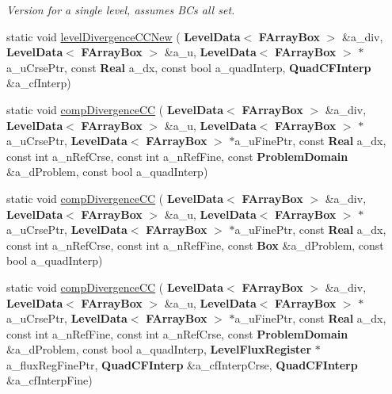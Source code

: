 \begin{DoxyCompactItemize}
\begin{DoxyCompactList}\small\item\em Version for a single level, assumes B\+Cs all set. \end{DoxyCompactList}\item 
static void \hyperlink{class_divergence_a77ec6a5b421cc2360223b7b0879786e8}{level\+Divergence\+C\+C\+New} (\textbf{ Level\+Data}$<$ \textbf{ F\+Array\+Box} $>$ \&a\+\_\+div, \textbf{ Level\+Data}$<$ \textbf{ F\+Array\+Box} $>$ \&a\+\_\+u, \textbf{ Level\+Data}$<$ \textbf{ F\+Array\+Box} $>$ $\ast$a\+\_\+u\+Crse\+Ptr, const \textbf{ Real} a\+\_\+dx, const bool a\+\_\+quad\+Interp, \textbf{ Quad\+C\+F\+Interp} \&a\+\_\+cf\+Interp)
\item 
static void \hyperlink{class_divergence_af3bff43b62b95d79fcd50484019e3e41}{comp\+Divergence\+CC} (\textbf{ Level\+Data}$<$ \textbf{ F\+Array\+Box} $>$ \&a\+\_\+div, \textbf{ Level\+Data}$<$ \textbf{ F\+Array\+Box} $>$ \&a\+\_\+u, \textbf{ Level\+Data}$<$ \textbf{ F\+Array\+Box} $>$ $\ast$a\+\_\+u\+Crse\+Ptr, \textbf{ Level\+Data}$<$ \textbf{ F\+Array\+Box} $>$ $\ast$a\+\_\+u\+Fine\+Ptr, const \textbf{ Real} a\+\_\+dx, const int a\+\_\+n\+Ref\+Crse, const int a\+\_\+n\+Ref\+Fine, const \textbf{ Problem\+Domain} \&a\+\_\+d\+Problem, const bool a\+\_\+quad\+Interp)
\item 
static void \hyperlink{class_divergence_ad1d85e2db60cacec07a004c9d0b19b24}{comp\+Divergence\+CC} (\textbf{ Level\+Data}$<$ \textbf{ F\+Array\+Box} $>$ \&a\+\_\+div, \textbf{ Level\+Data}$<$ \textbf{ F\+Array\+Box} $>$ \&a\+\_\+u, \textbf{ Level\+Data}$<$ \textbf{ F\+Array\+Box} $>$ $\ast$a\+\_\+u\+Crse\+Ptr, \textbf{ Level\+Data}$<$ \textbf{ F\+Array\+Box} $>$ $\ast$a\+\_\+u\+Fine\+Ptr, const \textbf{ Real} a\+\_\+dx, const int a\+\_\+n\+Ref\+Crse, const int a\+\_\+n\+Ref\+Fine, const \textbf{ Box} \&a\+\_\+d\+Problem, const bool a\+\_\+quad\+Interp)
\item 
static void \hyperlink{class_divergence_a4bafaf6a0fee4270b05bfb1b31c915ed}{comp\+Divergence\+CC} (\textbf{ Level\+Data}$<$ \textbf{ F\+Array\+Box} $>$ \&a\+\_\+div, \textbf{ Level\+Data}$<$ \textbf{ F\+Array\+Box} $>$ \&a\+\_\+u, \textbf{ Level\+Data}$<$ \textbf{ F\+Array\+Box} $>$ $\ast$a\+\_\+u\+Crse\+Ptr, \textbf{ Level\+Data}$<$ \textbf{ F\+Array\+Box} $>$ $\ast$a\+\_\+u\+Fine\+Ptr, const \textbf{ Real} a\+\_\+dx, const int a\+\_\+n\+Ref\+Fine, const int a\+\_\+n\+Ref\+Crse, const \textbf{ Problem\+Domain} \&a\+\_\+d\+Problem, const bool a\+\_\+quad\+Interp, \textbf{ Level\+Flux\+Register} $\ast$a\+\_\+flux\+Reg\+Fine\+Ptr, \textbf{ Quad\+C\+F\+Interp} \&a\+\_\+cf\+Interp\+Crse, \textbf{ Quad\+C\+F\+Interp} \&a\+\_\+cf\+Interp\+Fine)

\end{DoxyCompactItemize}
